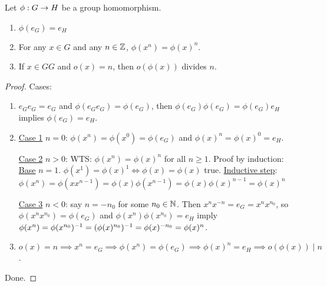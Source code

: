 \documentclass[]{article}
\begin{document}
\begin{theorem}
	Let $\phi :G\rightarrow H$ be a group homomorphism.
	\begin{enumerate}
		\item $\phi(e_G) = e_H$
		\item For any $x\in G$ and any $n\in\mathbb{Z}$, $\phi(x^n) = \phi(x)^n$.
		\item If $x\in GG$ and $o(x) = n$, then $o(\phi(x))$ divides $n$.
	\end{enumerate}
\end{theorem}
\begin{proof}
	Cases:
	\begin{enumerate}
		\item $e_G e_G = e_G$ and $\phi(e_G e_G) = \phi(e_G)$, then $\phi(e_G)\phi(e_G) = \phi(e_G) e_H$ implies $\phi(e_G) = e_H$.
		\item \ul{Case 1} $n=0$: $\phi(x^n) = \phi(x^0) = \phi(e_G)$ and $\phi(x)^n = \phi(x)^0 = e_H$.

			\ul{Case 2} $n>0$: WTS: $\phi(x^n) = \phi(x)^n$ for all $n\geq 1$.
			Proof by induction: \ul{Base} $n=1$. $\phi(x^1) = \phi(x)^1 \iff \phi(x) = \phi(x)$ true.
			\ul{Inductive step}: $\phi(x^n) = \phi(xx^{n-1}) = \phi(x)\phi(x^{n-1}) = \phi(x)\phi(x)^{n-1} = \phi(x)^n$

			\ul{Case 3} $n<0$: say $n=-n_0$ for some $n_0\in\mathbb{N}$. Then $x^n x^{-n} = e_G = x^n x^{n_0}$, so $\phi(x^nx^{n_0}) = \phi(e_G)$ and $\phi(x^n)\phi(x^{n_0}) = e_H$ imply $\phi(x^n) = \phi(x^{n_0})^{-1} = (\phi(x)^{n_0})^{-1} = \phi(x)^{-n_0} = \phi(x)^n$.
		\item $o(x) = n \implies x^n = e_G \implies \phi(x^n) = \phi(e_G) \implies \phi(x)^n = e_H \implies o(\phi(x))\mid n$.
	\end{enumerate}
	Done.
\end{proof}
\end{document}
